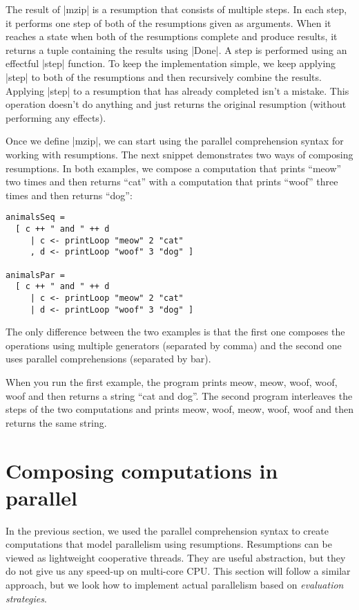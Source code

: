 \documentclass{tmr}
\begin{document}
The result of |mzip| is a resumption that consists of multiple steps. In each step, it performs
one step of both of the resumptions given as arguments. When it reaches a state when both of the
resumptions complete and produce results, it returns a tuple containing the results using |Done|.
A step is performed using an effectful |step| function. To keep the implementation simple, we keep
applying |step| to both of the resumptions and then recursively combine the results. Applying
|step| to a resumption that has already completed isn't a mistake. This operation doesn't do 
anything and just returns the original resumption (without performing any effects).

Once we define |mzip|, we can start using the parallel comprehension syntax for working with 
resumptions. The next snippet demonstrates two ways of composing resumptions. In both examples, we 
compose a computation that prints ``meow'' two times and then returns ``cat'' with a computation 
that prints ``woof'' three times and then returns ``dog'':

\begin{verbatim}
animalsSeq = 
  [ c ++ " and " ++ d
     | c <- printLoop "meow" 2 "cat" 
     , d <- printLoop "woof" 3 "dog" ]

animalsPar = 
  [ c ++ " and " ++ d
     | c <- printLoop "meow" 2 "cat" 
     | d <- printLoop "woof" 3 "dog" ]
\end{verbatim}

The only difference between the two examples is that the first one composes the operations using 
multiple generators (separated by comma) and the second one uses parallel comprehensions (separated
by bar).

When you run the first example, the program prints meow, meow, woof, woof, woof and then returns 
a string ``cat and dog''. The second program interleaves the steps of the two computations and 
prints meow, woof, meow, woof, woof and then returns the same string.	


\section{Composing computations in parallel}

In the previous section, we used the parallel comprehension syntax to create computations that 
model parallelism using resumptions. Resumptions can be viewed as lightweight cooperative threads.
They are useful abstraction, but they do not give us any speed-up on multi-core CPU. This section
will follow a similar approach, but we look how to implement actual parallelism based on 
\textit{evaluation strategies}. 
\end{document}
